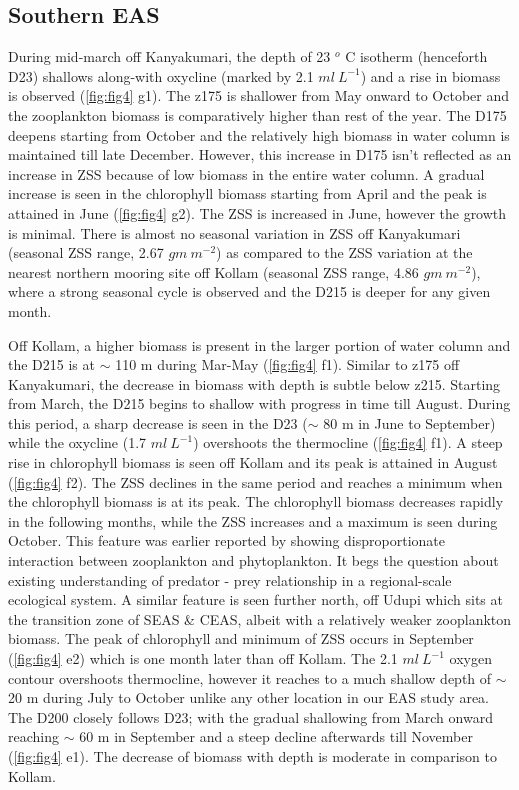 \documentclass{article}
\begin{document}
	\subsection{Southern EAS}
	During mid-march off Kanyakumari, the depth of 23 $^o$ C isotherm (henceforth D23) shallows along-with oxycline (marked by 2.1 $ml \ L^{-1}$) and a rise in biomass is observed (\cref{fig:fig4} g1). The z175 is shallower from May onward to October and the zooplankton biomass is comparatively higher than rest of the year. The D175 deepens starting from October and the relatively high biomass in water column is maintained till late December. However, this increase in D175 isn't reflected as an increase in ZSS because of low biomass in the entire water column. A gradual increase is seen in the chlorophyll biomass starting from April and the peak is attained in June (\cref{fig:fig4} g2). The ZSS is increased in June, however the growth is minimal. There is almost no seasonal variation in ZSS off Kanyakumari (seasonal ZSS range, 2.67 $gm\ m^{-2}$) as compared to the ZSS variation at the nearest northern mooring site off Kollam (seasonal ZSS range, 4.86 $gm\ m^{-2}$), where a strong seasonal cycle is observed and the D215 is deeper for any given month.
	
	Off Kollam, a higher biomass is present in the larger portion of water column and the D215 is at $\sim$ 110 m during Mar-May (\cref{fig:fig4} f1). Similar to z175 off Kanyakumari, the decrease in biomass with depth is subtle below z215. Starting from March, the D215 begins to shallow with progress in time till August. During this period, a sharp decrease is seen in the D23 ($\sim$ 80 m in June to September) while the oxycline (1.7 $ml \ L^{-1}$) overshoots the thermocline (\cref{fig:fig4} f1). A steep rise in chlorophyll biomass is seen off Kollam and its peak is attained in August (\cref{fig:fig4} f2). The ZSS declines in the same period and reaches a minimum when the chlorophyll biomass is at its peak. The chlorophyll biomass decreases rapidly in the following months, while the ZSS increases and a maximum is seen during October. This feature was earlier reported by \citep{aparna2022seasonal} showing disproportionate interaction between zooplankton and phytoplankton. It begs the question about existing understanding of predator - prey relationship in a regional-scale ecological system. A similar feature is seen further north, off Udupi which sits at the transition zone of SEAS \& CEAS, albeit with a relatively weaker zooplankton biomass. The peak of chlorophyll and minimum of ZSS occurs in September (\cref{fig:fig4} e2) which is one month later than off Kollam. The 2.1 $ml \ L^{-1}$  oxygen contour overshoots thermocline, however it reaches to a much shallow depth of $\sim$ 20 m during July to October unlike any other location in our EAS study area. The D200 closely follows D23; with the gradual shallowing from March onward reaching $\sim$ 60 m in September and a steep decline afterwards till November (\cref{fig:fig4} e1). The decrease of biomass with depth is moderate in comparison to Kollam.
	
\end{document}

